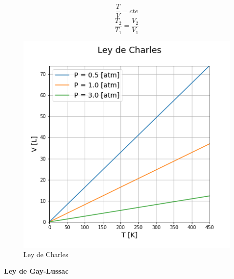         \begin{minipage}{0.4\linewidth}
            \[\frac{T}{V} = cte\]
            \[\frac{T_{2}}{T_{1}} = \frac{V_{2}}{V_{1}}\]
        \end{minipage}
        \begin{minipage}{0.5\linewidth}
            \begin{figure}
                \centering
                \includegraphics[width=\textwidth]{img/graficos/ley_charles.png}
                \caption{Ley de Charles}
                \label{fig:tv}
            \end{figure}
        \end{minipage}
        \newline
        \newpage
        
        \textbf{Ley de Gay-Lussac}
        
